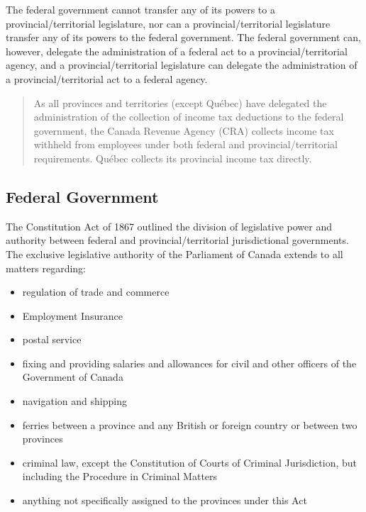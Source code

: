 \documentclass[letterpaper,10pt,english]{sphinxmanual}
\begin{document}
\sphinxAtStartPar
The federal government cannot transfer any of its powers to a provincial/territorial
legislature, nor can a provincial/territorial legislature transfer any of its powers to the federal
government. The federal government can, however, delegate the administration of a federal
act to a provincial/territorial agency, and a provincial/territorial legislature can delegate the
administration of a provincial/territorial act to a federal agency.
\begin{quote}

\sphinxAtStartPar
As all provinces and territories (except Québec) have delegated the administration of the
collection of income tax deductions to the federal government, the Canada Revenue Agency
(CRA) collects income tax withheld from employees under both federal and
provincial/territorial requirements. Québec collects its provincial income tax directly.
\end{quote}


\subsection{Federal Government}
\label{\detokenize{compliance:federal-government}}
\sphinxAtStartPar
The Constitution Act of 1867 outlined the division of legislative power and authority between
federal and provincial/territorial jurisdictional governments. The exclusive legislative
authority of the Parliament of Canada extends to all matters regarding:
\begin{itemize}
\item {} 
\sphinxAtStartPar
regulation of trade and commerce

\item {} 
\sphinxAtStartPar
Employment Insurance

\item {} 
\sphinxAtStartPar
postal service

\item {} 
\sphinxAtStartPar
fixing and providing salaries and allowances for civil and other officers of the Government of Canada

\item {} 
\sphinxAtStartPar
navigation and shipping

\item {} 
\sphinxAtStartPar
ferries between a province and any British or foreign country or between two provinces

\item {} 
\sphinxAtStartPar
criminal law, except the Constitution of Courts of Criminal Jurisdiction, but including the Procedure in Criminal Matters

\item {} 
\sphinxAtStartPar
anything not specifically assigned to the provinces under this Act

\end{itemize}
\end{document}
